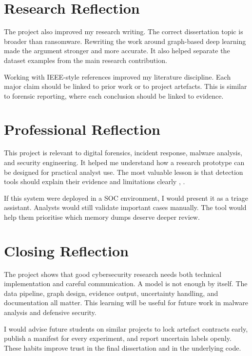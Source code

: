 \section{Research Reflection}

The project also improved my research writing. The correct dissertation topic is broader than ransomware. Rewriting the work around graph-based deep learning made the argument stronger and more accurate. It also helped separate the dataset examples from the main research contribution.

Working with IEEE-style references improved my literature discipline. Each major claim should be linked to prior work or to project artefacts. This is similar to forensic reporting, where each conclusion should be linked to evidence.

\section{Professional Reflection}

This project is relevant to digital forensics, incident response, malware analysis, and security engineering. It helped me understand how a research prototype can be designed for practical analyst use. The most valuable lesson is that detection tools should explain their evidence and limitations clearly \cite{doshi2017interpretable}, \cite{case2017memory}.

If this system were deployed in a SOC environment, I would present it as a triage assistant. Analysts would still validate important cases manually. The tool would help them prioritise which memory dumps deserve deeper review.

\section{Closing Reflection}

The project shows that good cybersecurity research needs both technical implementation and careful communication. A model is not enough by itself. The data pipeline, graph design, evidence output, uncertainty handling, and documentation all matter. This learning will be useful for future work in malware analysis and defensive security.

I would advise future students on similar projects to lock artefact contracts early, publish a manifest for every experiment, and report uncertain labels openly. These habits improve trust in the final dissertation and in the underlying code.

